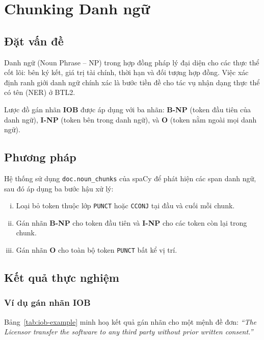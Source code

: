 \section{Chunking Danh ngữ}
\label{sec:np-chunking}

\subsection{Đặt vấn đề}

Danh ngữ (Noun Phrase -- NP) trong hợp đồng pháp lý đại diện cho các
thực thể cốt lõi: bên ký kết, giá trị tài chính, thời hạn và đối tượng
hợp đồng. Việc xác định ranh giới danh ngữ chính xác là bước tiền đề
cho tác vụ nhận dạng thực thể có tên (NER) ở BTL2.

Lược đồ gán nhãn \textbf{IOB} được áp dụng với ba nhãn:
\textbf{B-NP} (token đầu tiên của danh ngữ),
\textbf{I-NP} (token bên trong danh ngữ), và
\textbf{O} (token nằm ngoài mọi danh ngữ).

\subsection{Phương pháp}

Hệ thống sử dụng \texttt{doc.noun\_chunks} của spaCy để phát hiện các
span danh ngữ, sau đó áp dụng ba bước hậu xử lý:

\begin{enumerate}[(i)]
    \item Loại bỏ token thuộc lớp \texttt{PUNCT} hoặc \texttt{CCONJ}
          tại đầu và cuối mỗi chunk.
    \item Gán nhãn \textbf{B-NP} cho token đầu tiên và \textbf{I-NP}
          cho các token còn lại trong chunk.
    \item Gán nhãn \textbf{O} cho toàn bộ token \texttt{PUNCT} bất kể
          vị trí.
\end{enumerate}

\subsection{Kết quả thực nghiệm}

\subsubsection{Ví dụ gán nhãn IOB}

Bảng~\ref{tab:iob-example} minh hoạ kết quả gán nhãn cho một mệnh đề đơn:
\textit{``The Licensor transfer the software to any third party without prior written consent.''}

